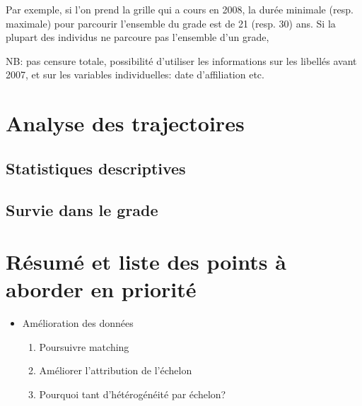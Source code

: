 \documentclass[11pt,a4paper]{article}
\begin{document}
Par exemple, si l'on prend la grille qui a cours en 2008, la durée minimale (resp. maximale) pour parcourir l'ensemble du grade est de 21 (resp. 30) ans. Si la plupart des individus ne parcoure pas l'ensemble d'un grade, 

NB: pas censure totale, possibilité d'utiliser les informations sur les libellés avant 2007, et sur les variables individuelles: date d'affiliation etc. 





\section{Analyse des trajectoires}

\subsection{Statistiques descriptives}


\subsection{Survie dans le grade}





\section{Résumé et liste des points à aborder en priorité}


\begin{itemize}
\item Amélioration des données 
\begin{enumerate}
\item Poursuivre matching
\item Améliorer l'attribution de l'échelon
\item Pourquoi tant d'hétérogénéité par échelon? 
\end{enumerate}
\end{itemize}
\end{document}
